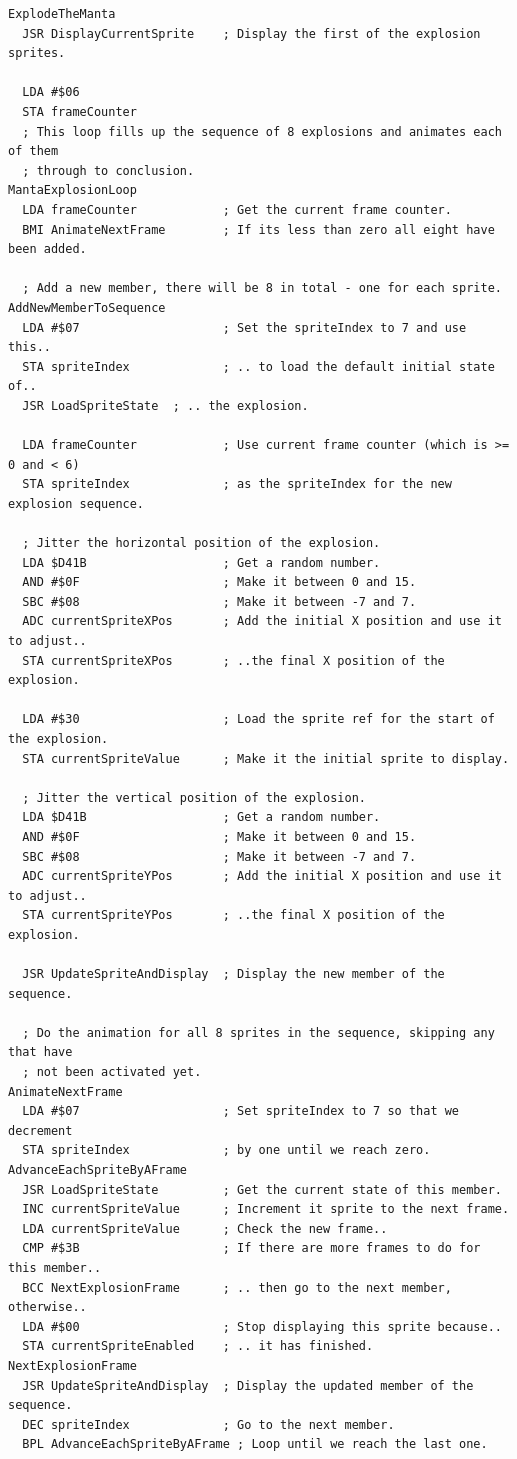 \clearpage
\begin{lstlisting}[basicstyle=\scriptsize\ttfamily, escapechar=\%]
ExplodeTheManta
  JSR DisplayCurrentSprite    ; Display the first of the explosion sprites.

  LDA #$06
  STA frameCounter
  ; This loop fills up the sequence of 8 explosions and animates each of them
  ; through to conclusion.
MantaExplosionLoop
  LDA frameCounter            ; Get the current frame counter.
  BMI AnimateNextFrame        ; If its less than zero all eight have been added.

  ; Add a new member, there will be 8 in total - one for each sprite.
AddNewMemberToSequence
  LDA #$07                    ; Set the spriteIndex to 7 and use this..
  STA spriteIndex             ; .. to load the default initial state of..
  JSR LoadSpriteState  ; .. the explosion.

  LDA frameCounter            ; Use current frame counter (which is >= 0 and < 6)
  STA spriteIndex             ; as the spriteIndex for the new explosion sequence.

  ; Jitter the horizontal position of the explosion.
  LDA $D41B                   ; Get a random number.
  AND #$0F                    ; Make it between 0 and 15.
  SBC #$08                    ; Make it between -7 and 7.
  ADC currentSpriteXPos       ; Add the initial X position and use it to adjust..
  STA currentSpriteXPos       ; ..the final X position of the explosion.

  LDA #$30                    ; Load the sprite ref for the start of the explosion.
  STA currentSpriteValue      ; Make it the initial sprite to display.

  ; Jitter the vertical position of the explosion.
  LDA $D41B                   ; Get a random number.
  AND #$0F                    ; Make it between 0 and 15.
  SBC #$08                    ; Make it between -7 and 7.
  ADC currentSpriteYPos       ; Add the initial X position and use it to adjust..
  STA currentSpriteYPos       ; ..the final X position of the explosion.

  JSR UpdateSpriteAndDisplay  ; Display the new member of the sequence.

  ; Do the animation for all 8 sprites in the sequence, skipping any that have
  ; not been activated yet.
AnimateNextFrame
  LDA #$07                    ; Set spriteIndex to 7 so that we decrement 
  STA spriteIndex             ; by one until we reach zero.
AdvanceEachSpriteByAFrame                                                         
  JSR LoadSpriteState         ; Get the current state of this member.
  INC currentSpriteValue      ; Increment it sprite to the next frame.
  LDA currentSpriteValue      ; Check the new frame.. 
  CMP #$3B                    ; If there are more frames to do for this member..  
  BCC NextExplosionFrame      ; .. then go to the next member, otherwise.. 
  LDA #$00                    ; Stop displaying this sprite because..
  STA currentSpriteEnabled    ; .. it has finished.
NextExplosionFrame
  JSR UpdateSpriteAndDisplay  ; Display the updated member of the sequence.
  DEC spriteIndex             ; Go to the next member.
  BPL AdvanceEachSpriteByAFrame ; Loop until we reach the last one.


\end{lstlisting}

